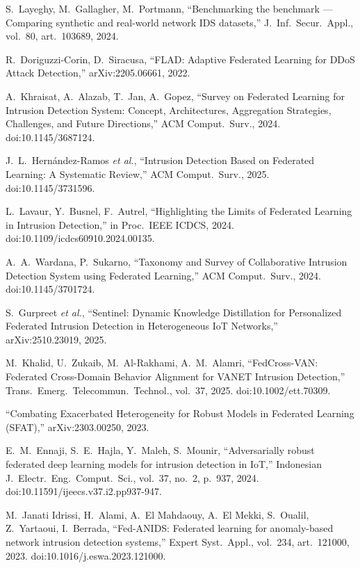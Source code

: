 \documentclass[11pt,a4paper]{article}
\begin{document}
\begin{enumerate}[label={[\arabic*]},leftmargin=2.6em]
\item S.~Layeghy, M.~Gallagher, M.~Portmann, ``Benchmarking the benchmark ---
Comparing synthetic and real-world network IDS datasets,'' J.\ Inf.\ Secur.\
Appl., vol.~80, art.~103689, 2024.

\item R.~Doriguzzi-Corin, D.~Siracusa, ``FLAD: Adaptive Federated Learning for
DDoS Attack Detection,'' arXiv:2205.06661, 2022.

\item A.~Khraisat, A.~Alazab, T.~Jan, A.~Gopez, ``Survey on Federated Learning
for Intrusion Detection System: Concept, Architectures, Aggregation Strategies,
Challenges, and Future Directions,'' ACM Comput.\ Surv., 2024.
doi:10.1145/3687124.

\item J.~L.~Hern\'andez-Ramos \emph{et al.}, ``Intrusion Detection Based on
Federated Learning: A Systematic Review,'' ACM Comput.\ Surv., 2025.
doi:10.1145/3731596.

\item L.~Lavaur, Y.~Busnel, F.~Autrel, ``Highlighting the Limits of Federated
Learning in Intrusion Detection,'' in Proc.\ IEEE ICDCS, 2024.
doi:10.1109/icdcs60910.2024.00135.

\item A.~A.~Wardana, P.~Sukarno, ``Taxonomy and Survey of Collaborative
Intrusion Detection System using Federated Learning,'' ACM Comput.\ Surv.,
2024. doi:10.1145/3701724.

\item S.~Gurpreet \emph{et al.}, ``Sentinel: Dynamic Knowledge Distillation for
Personalized Federated Intrusion Detection in Heterogeneous IoT Networks,''
arXiv:2510.23019, 2025.

\item M.~Khalid, U.~Zukaib, M.~Al-Rakhami, A.~M.~Alamri, ``FedCross-VAN:
Federated Cross-Domain Behavior Alignment for VANET Intrusion Detection,''
Trans.\ Emerg.\ Telecommun.\ Technol., vol.~37, 2025. doi:10.1002/ett.70309.

\item ``Combating Exacerbated Heterogeneity for Robust Models in Federated
Learning (SFAT),'' arXiv:2303.00250, 2023.

\item E.~M.~Ennaji, S.~E.~Hajla, Y.~Maleh, S.~Mounir, ``Adversarially robust
federated deep learning models for intrusion detection in IoT,'' Indonesian J.\
Electr.\ Eng.\ Comput.\ Sci., vol.~37, no.~2, p.~937, 2024.
doi:10.11591/ijeecs.v37.i2.pp937-947.

\item M.~Janati Idrissi, H.~Alami, A.~El Mahdaouy, A.~El Mekki, S.~Oualil,
Z.~Yartaoui, I.~Berrada, ``Fed-ANIDS: Federated learning for anomaly-based
network intrusion detection systems,'' Expert Syst.\ Appl., vol.~234,
art.~121000, 2023. doi:10.1016/j.eswa.2023.121000.

\end{enumerate}
\end{document}
